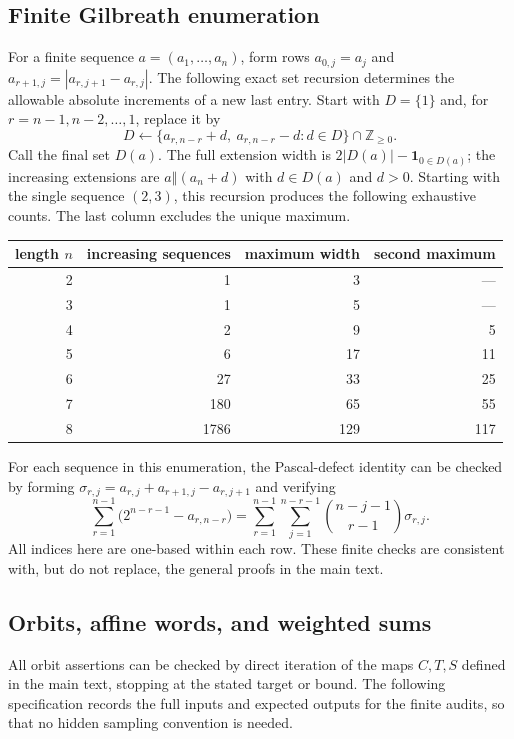 \documentclass[11pt,a4paper]{article}
\theoremstyle{definition}
\theoremstyle{remark}
\numberwithin{equation}{section}
\begin{document}
\subsection{Finite Gilbreath enumeration}

For a finite sequence $a=(a_1,\ldots,a_n)$, form rows
$a_{0,j}=a_j$ and $a_{r+1,j}=|a_{r,j+1}-a_{r,j}|$.
The following exact set recursion determines the allowable absolute
increments of a new last entry. Start with $D=\{1\}$ and, for
$r=n-1,n-2,\ldots,1$, replace it by
\[
 D\longleftarrow
 \{a_{r,n-r}+d,\ a_{r,n-r}-d:d\in D\}\cap\mathbb Z_{\ge0}.
\]
Call the final set $D(a)$. The full extension width is
$2|D(a)|-\mathbf1_{0\in D(a)}$; the increasing extensions are
$a\mathbin\Vert(a_n+d)$ with $d\in D(a)$ and $d>0$.
Starting with the single sequence $(2,3)$, this recursion produces the
following exhaustive counts. The last column excludes the unique maximum.
\begin{center}
\begin{tabular}{r r r r}
\toprule
length $n$ & increasing sequences & maximum width & second maximum\\
\midrule
2&1&3&---\\
3&1&5&---\\
4&2&9&5\\
5&6&17&11\\
6&27&33&25\\
7&180&65&55\\
8&1786&129&117\\\bottomrule
\end{tabular}
\end{center}
For each sequence in this enumeration, the Pascal-defect identity can be
checked by forming
$\sigma_{r,j}=a_{r,j}+a_{r+1,j}-a_{r,j+1}$ and verifying
\[
 \sum_{r=1}^{n-1}\bigl(2^{n-r-1}-a_{r,n-r}\bigr)
 =\sum_{r=1}^{n-1}\sum_{j=1}^{n-r-1}
   \binom{n-j-1}{r-1}\sigma_{r,j}.
\]
All indices here are one-based within each row. These finite checks are
consistent with, but do not replace, the general proofs in the main text.

\subsection{Orbits, affine words, and weighted sums}

All orbit assertions can be checked by direct iteration of the maps
$C,T,S$ defined in the main text, stopping at the stated target or bound.
The following specification records the full inputs and expected outputs
for the finite audits, so that no hidden sampling convention is needed.
\end{document}
